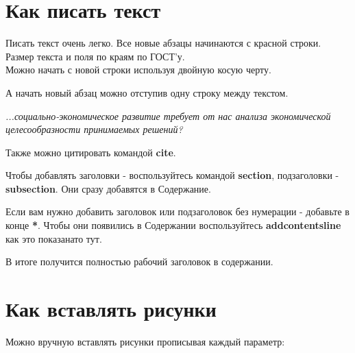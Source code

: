 \section{Как писать текст}
Писать текст очень легко. Все новые абзацы начинаются с красной строки. Размер текста и поля по краям по ГОСТ'у. \\Можно начать с новой строки используя двойную косую черту.

А начать новый абзац можно отступив одну строку между текстом.

\textit{...социально-экономическое развитие требует от нас анализа экономической целесообразности принимаемых решений?} \cite{kistyakovskii} 

Также можно цитировать командой \textbf{cite}.

Чтобы добавлять заголовки - воспользуйтесь командой \textbf{section}, подзаголовки - \textbf{subsection}. Они сразу добавятся в Содержание. 

Если вам нужно добавить заголовок или подзаголовок без нумерации - добавьте в конце \textbf{*}. Чтобы они появились в Содержании воспользуйтесь \textbf{addcontentsline} как это показанато тут.



В итоге получится полностью рабочий заголовок в содержании.

\section{Как вставлять рисунки}


Можно вручную вставлять рисунки прописывая каждый параметр:




